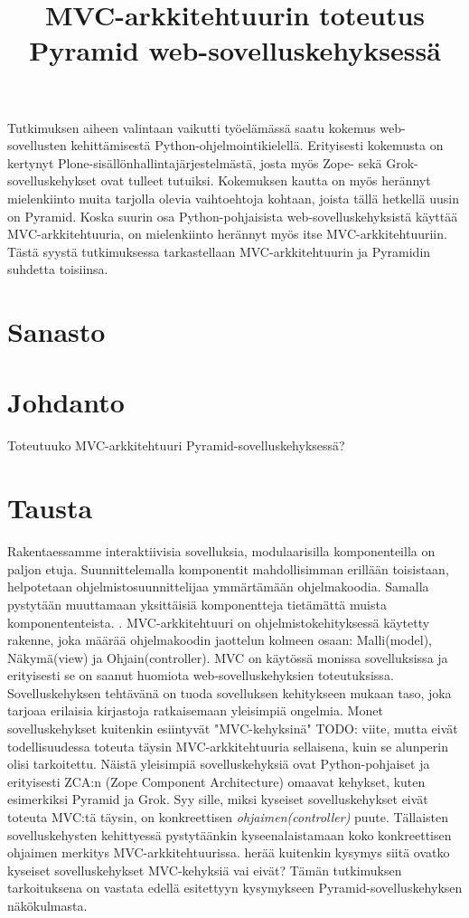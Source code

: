 \documentclass[finnish,utf8,nonumbib,palatino,kandi]{gradu2}
\title{MVC-arkkitehtuurin toteutus Pyramid web-sovelluskehyksessä}
\begin{document}
\preface

Tutkimuksen aiheen valintaan vaikutti työelämässä saatu
 kokemus web-sovellusten kehittämisestä Python-ohjelmointikielellä. Erityisesti
kokemusta on kertynyt Plone-sisällönhallintajärjestelmästä, josta myös Zope- sekä
Grok-sovelluskehykset ovat tulleet tutuiksi. Kokemuksen kautta on myös herännyt mielenkiinto
muita tarjolla olevia vaihtoehtoja kohtaan, joista tällä hetkellä uusin on Pyramid. Koska suurin osa Python-pohjaisista
web-sovelluskehyksistä käyttää MVC-arkkitehtuuria, on mielenkiinto herännyt myös itse MVC-arkkitehtuuriin. Tästä syystä
tutkimuksessa tarkastellaan MVC-arkkitehtuurin ja Pyramidin suhdetta toisiinsa.

\mainmatter
\section{Sanasto}

\section{Johdanto}
Toteutuuko MVC-arkkitehtuuri Pyramid-sovelluskehyksessä?

\section{Tausta}
Rakentaessamme interaktiivisia sovelluksia, modulaarisilla komponenteilla on paljon etuja. Suunnittelemalla komponentit mahdollisimman erillään toisistaan, helpotetaan
ohjelmistosuunnittelijaa ymmärtämään ohjelmakoodia. Samalla pystytään muuttamaan yksittäisiä komponentteja tietämättä muista komponententeista. \cite{Krasner:desc}.
MVC-arkkitehtuuri on ohjelmistokehityksessä käytetty rakenne, joka määrää ohjelmakoodin jaottelun kolmeen osaan: Malli(model), Näkymä(view) ja Ohjain(controller). MVC on käytössä monissa sovelluksissa ja erityisesti se on saanut
huomiota web-sovelluskehyksien toteutuksissa. Sovelluskehyksen tehtävänä on tuoda sovelluksen kehitykseen mukaan
taso, joka tarjoaa erilaisia kirjastoja ratkaisemaan yleisimpiä ongelmia. Monet sovelluskehykset kuitenkin esiintyvät "MVC-kehyksinä" TODO: viite, mutta eivät 
todellisuudessa toteuta täysin MVC-arkkitehtuuria sellaisena, kuin se alunperin olisi tarkoitettu. Näistä yleisimpiä sovelluskehyksiä ovat Python-pohjaiset
ja erityisesti ZCA:n (Zope Component Architecture) omaavat kehykset, kuten esimerkiksi Pyramid ja Grok. Syy sille, miksi
kyseiset sovelluskehykset eivät toteuta MVC:tä täysin, on konkreettisen \emph{ohjaimen(controller)} puute. Tällaisten
sovelluskehysten kehittyessä pystytäänkin kyseenalaistamaan koko konkreettisen ohjaimen merkitys MVC-arkkitehtuurissa.
herää kuitenkin kysymys siitä ovatko kyseiset sovelluskehykset MVC-kehyksiä vai eivät? Tämän tutkimuksen tarkoituksena on vastata edellä esitettyyn
kysymykseen Pyramid-sovelluskehyksen näkökulmasta.
\end{document}
